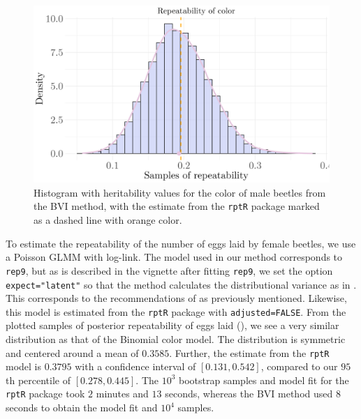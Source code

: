 \begin{figure}[H]
  \centering
  \includegraphics[width=1\linewidth]{Figures/Stoffel Comparison/Heritability_colour_Binomial.png}
  \caption[Estimated repeatability of color in male beetles]{Histogram with heritability values for the color of male beetles from the BVI method, with the estimate from the \texttt{rptR} package marked as a dashed line with orange color.}
  \label{fig:heritability_colour_Binomial}
\end{figure}
\noindent To estimate the repeatability of the number of eggs laid by female beetles, we use a Poisson GLMM with log-link. The model used in our method corresponds to \texttt{rep9}, but as is described in the vignette after fitting \texttt{rep9}, we set the option \texttt{expect="latent"} so that the method calculates the distributional variance as in . This corresponds to the recommendations of \citet{nakagawa2017} as previously mentioned. Likewise, this model is estimated from the \texttt{rptR} package with \texttt{adjusted=FALSE}. From the plotted samples of posterior repeatability of eggs laid (), we see a very similar distribution as that of the Binomial color model. The distribution is symmetric and centered around a mean of $0.3585$. Further, the estimate from the \texttt{rptR} model is $0.3795$ with a confidence interval of $[0.131, 0.542]$, compared to our $95$th percentile of $[0.278, 0.445]$. The $10^3$ bootstrap samples and model fit for the \texttt{rptR} package took $2$ minutes and $13$ seconds, whereas the BVI method used $8$ seconds to obtain the model fit and $10^4$ samples.
